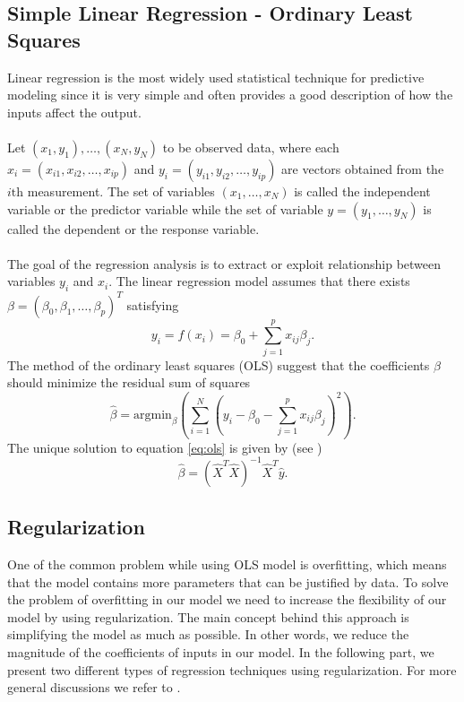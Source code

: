 \documentclass [11pt]{article}
\begin{document}
\subsection{Simple Linear Regression - Ordinary Least Squares}
Linear regression is the most widely used statistical technique for predictive modeling since it is very simple and often provides a good description of how the inputs affect the output.\\
\\
Let $(x_{1},y_{1}),\ldots,(x_{N},y_{N})$ to be observed data, where each $x_{i} = (x_{i1},x_{i2},\ldots,x_{i p})$ and $y_{i} = (y_{i1},y_{i2},\ldots,y_{i p})$ are vectors obtained from the $i\text{th}$ measurement. The set of variables $(x_{1},\ldots,x_{N})$ is called the independent variable or the predictor variable while the set of variable $y=(y_{1},\ldots,y_{N})$ is called the dependent or the response variable. \\
\\
The goal of the regression analysis is to extract or exploit relationship between variables $y_i$ and $x_i$. The linear regression model assumes that there exists $\beta=(\beta_{0},\beta_{1},\ldots,\beta_{p})^{T}$ satisfying 
\begin{equation}
y_{i}=f(x_{i})=\beta_{0} + \sum_{j=1}^{p}x_{ij}\beta_{j}.
\end{equation}
The method of the ordinary least squares (OLS) suggest that the coefficients $\beta$ should minimize the residual sum of squares
\begin{equation}
\hat{\beta}=\text{argmin}_{\beta} ( \sum_{i=1}^{N}(y_{i}- \beta_{0}- \sum_{j=1}^{p}x_{ij}\beta_{j})^{2}).
\label{eq:ols}
\end{equation}
The unique solution to equation \eqref{eq:ols} is given by (see \cite{def})
\begin{equation}
\hat{\beta} =\left(\hat{X}^T\hat{X}\right)^{-1}\hat{X}^T\hat{y}.
\end{equation}

\subsection{Regularization}
One of the common problem while using OLS model is overfitting, which means that the model contains more parameters that can be justified by data. To solve the problem of overfitting in our model we need to increase the flexibility of our model by using regularization. The main concept behind this approach is simplifying the model as much as possible. In other words, we reduce the magnitude of the coefficients of inputs in our model. In the following part, we present two different types of regression techniques using regularization. For more general discussions we refer to \cite{abc}.
\end{document}
